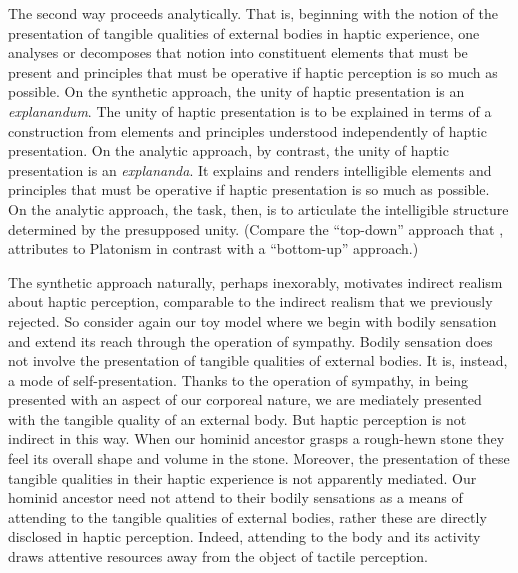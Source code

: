 The second way proceeds analytically. That is, beginning with the notion of the presentation of tangible qualities of external bodies in haptic experience, one analyses or decomposes that notion into constituent elements that must be present and principles that must be operative if haptic perception is so much as possible. On the synthetic approach, the unity of haptic presentation is an \emph{explanandum}. The unity of haptic presentation is to be explained in terms of a construction from elements and principles understood independently of haptic presentation. On the analytic approach, by contrast, the unity of haptic presentation is an \emph{explananda}. It explains and renders intelligible elements and principles that must be operative if haptic presentation is so much as possible. On the analytic approach, the task, then, is to articulate the intelligible structure determined by the presupposed unity. (Compare the ``top-down'' approach that \citealt[chapter 1]{Gerson:2005aa}, attributes to Platonism in contrast with a ``bottom-up'' approach.)

The synthetic approach naturally, perhaps inexorably, motivates indirect realism about haptic perception, comparable to the indirect realism that we previously rejected. So consider again our toy model where we begin with bodily sensation and extend its reach through the operation of sympathy. Bodily sensation does not involve the presentation of tangible qualities of external bodies. It is, instead, a mode of self-presentation. Thanks to the operation of sympathy, in being presented with an aspect of our corporeal nature, we are mediately presented with the tangible quality of an external body. But haptic perception is not indirect in this way. When our hominid ancestor grasps a rough-hewn stone they feel its overall shape and volume in the stone. Moreover, the presentation of these tangible qualities in their haptic experience is not apparently mediated. Our hominid ancestor need not attend to their bodily sensations as a means of attending to the tangible qualities of external bodies, rather these are directly disclosed in haptic perception. Indeed, attending to the body and its activity draws attentive resources away from the object of tactile perception. 



